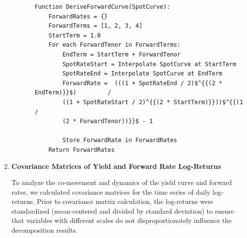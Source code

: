 \documentclass{article}
\begin{document}
\begin{enumerate}
\begin{enumerate}
\begin{enumerate}
\begin{verbatim}
Function DeriveForwardCurve(SpotCurve):
    ForwardRates = {}
    ForwardTerms = [1, 2, 3, 4]
    StartTerm = 1.0
	For each ForwardTenor in ForwardTerms:
        EndTerm = StartTerm + ForwardTenor
        SpotRateStart = Interpolate SpotCurve at StartTerm
        SpotRateEnd = Interpolate SpotCurve at EndTerm
		ForwardRate =  (((1 + SpotRateEnd / 2)$^{{(2 * EndTerm)}}$) 		/
        ((1 + SpotRateStart / 2)^{{(2 * StartTerm)}}))$^{{(1 / 
        (2 * ForwardTenor))}}$ - 1

        Store ForwardRate in ForwardRates
    Return ForwardRates
\end{verbatim}
	\end{enumerate}
	\end{enumerate}

    \item \textbf{Covariance Matrices of Yield and Forward Rate Log-Returns}

        To analyze the co-movement and dynamics of the yield curve and forward rates, we calculated covariance matrices for the time series of daily log-returns. Prior to covariance matrix calculation, the log-returns were standardized (mean-centered and divided by standard deviation) to ensure that variables with different scales do not disproportionately influence the decomposition results.


\end{enumerate}
\end{document}
